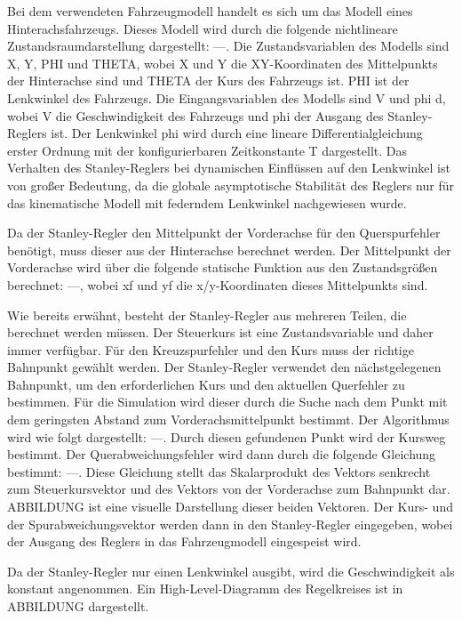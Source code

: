 \documentclass[arbeit=studie,oneside,BCOR=12mm]{ArbeitRST}
\begin{document}
Bei dem verwendeten Fahrzeugmodell handelt es sich um das Modell eines Hinterachsfahrzeugs. Dieses Modell wird durch die folgende nichtlineare Zustandsraumdarstellung dargestellt:
---.
Die Zustandsvariablen des Modells sind X, Y, PHI und THETA, wobei X und Y die XY-Koordinaten des Mittelpunkts der Hinterachse sind und THETA der Kurs des Fahrzeugs ist. PHI ist der Lenkwinkel des Fahrzeugs. Die Eingangsvariablen des Modells sind V und phi d, wobei V die Geschwindigkeit des Fahrzeugs und phi der Ausgang des Stanley-Reglers ist. Der Lenkwinkel phi wird durch eine lineare Differentialgleichung erster Ordnung mit der konfigurierbaren Zeitkonstante T dargestellt. Das Verhalten des Stanley-Reglers bei dynamischen Einflüssen auf den Lenkwinkel ist von großer Bedeutung, da die globale asymptotische Stabilität des Reglers nur für das kinematische Modell mit federndem Lenkwinkel nachgewiesen wurde. 

Da der Stanley-Regler den Mittelpunkt der Vorderachse für den Querspurfehler benötigt, muss dieser aus der Hinterachse berechnet werden.
Der Mittelpunkt der Vorderachse wird über die folgende statische Funktion aus den Zustandsgrößen berechnet:
---,
wobei xf und yf die x/y-Koordinaten dieses Mittelpunkts sind. 

Wie bereits erwähnt, besteht der Stanley-Regler aus mehreren Teilen, die berechnet werden müssen. Der Steuerkurs ist eine Zustandsvariable und daher immer verfügbar. Für den Kreuzspurfehler und den Kurs muss der richtige Bahnpunkt gewählt werden. Der Stanley-Regler verwendet den nächstgelegenen Bahnpunkt, um den erforderlichen Kurs und den aktuellen Querfehler zu bestimmen. Für die Simulation wird dieser durch die Suche nach dem Punkt mit dem geringsten Abstand zum Vorderachsmittelpunkt bestimmt. Der Algorithmus wird wie folgt dargestellt: 
---.
Durch diesen gefundenen Punkt wird der Kursweg bestimmt. Der Querabweichungsfehler wird dann durch die folgende Gleichung bestimmt:
---.
Diese Gleichung stellt das Skalarprodukt des Vektors senkrecht zum Steuerkursvektor und des Vektors von der Vorderachse zum Bahnpunkt dar. ABBILDUNG ist eine visuelle Darstellung dieser beiden Vektoren.
Der Kurs- und der Spurabweichungsvektor werden dann in den Stanley-Regler eingegeben, wobei der Ausgang des Reglers in das Fahrzeugmodell eingespeist wird. 

Da der Stanley-Regler nur einen Lenkwinkel ausgibt, wird die Geschwindigkeit als konstant angenommen. 
Ein High-Level-Diagramm des Regelkreises ist in ABBILDUNG dargestellt.
\end{document}
